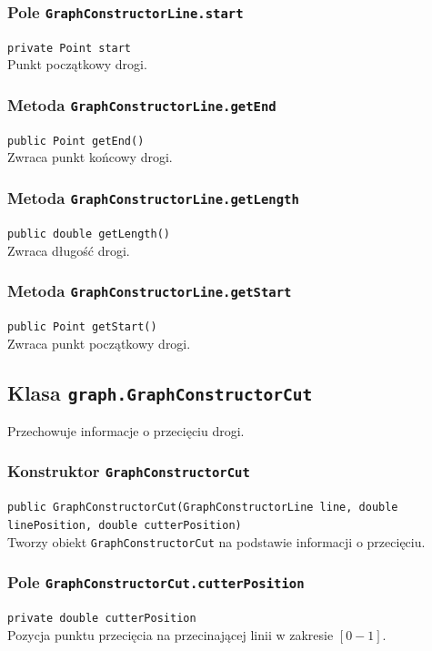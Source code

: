 \documentclass{article}
\begin{document}
\subsubsection{Pole \texttt{GraphConstructorLine.start}}
\texttt{private Point start} \\
Punkt początkowy drogi.

\subsubsection{Metoda \texttt{GraphConstructorLine.getEnd}}
\texttt{public Point getEnd()} \\
Zwraca punkt końcowy drogi.

\subsubsection{Metoda \texttt{GraphConstructorLine.getLength}}
\texttt{public double getLength()} \\
Zwraca długość drogi.

\subsubsection{Metoda \texttt{GraphConstructorLine.getStart}}
\texttt{public Point getStart()} \\
Zwraca punkt początkowy drogi.

\subsection{Klasa \texttt{graph.GraphConstructorCut}}
Przechowuje informacje o przecięciu drogi.

\subsubsection{Konstruktor \texttt{GraphConstructorCut}}
\texttt{public GraphConstructorCut(GraphConstructorLine line, double linePosition, double cutterPosition)} \\
Tworzy obiekt \texttt{GraphConstructorCut} na podstawie informacji o przecięciu.

\subsubsection{Pole \texttt{GraphConstructorCut.cutterPosition}}
\texttt{private double cutterPosition} \\
Pozycja punktu przecięcia na przecinającej linii w zakresie \([0-1]\).
\end{document}
